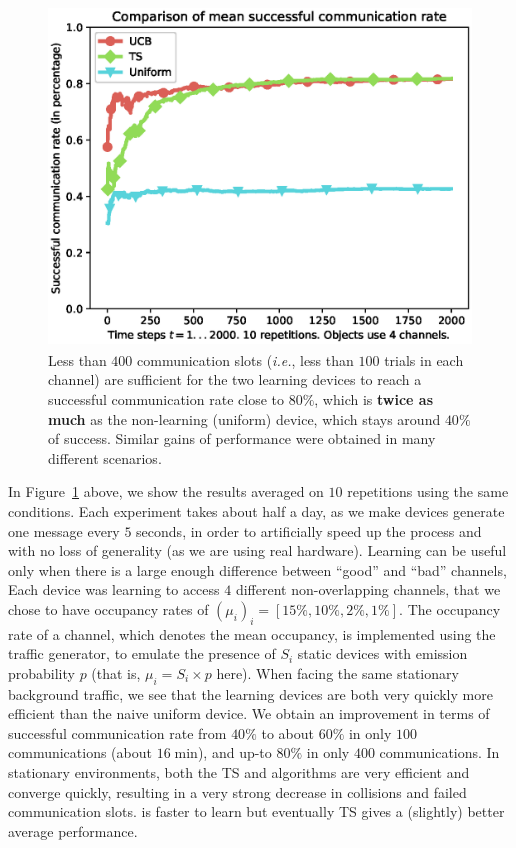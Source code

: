 \begin{figure}[!h]
	\centering
    \includegraphics[height=9.0cm]{plot_datafile_append_Uniform_vs_UCB_vs_TS.eps}
    \caption{Less than $400$ communication slots (\emph{i.e.}, less than $100$ trials in each channel) are sufficient for the two learning devices to reach a successful communication rate close to $80\%$, which is \textbf{twice as much} as the non-learning (uniform) device, which stays around $40\%$ of success. Similar gains of performance were obtained in many different scenarios.}
    \label{fig:42:plot_datafile_append_Uniform_vs_UCB_vs_TS}
\end{figure}

In Figure~\ref{fig:42:plot_datafile_append_Uniform_vs_UCB_vs_TS} above, we show the results averaged on $10$ repetitions using the same conditions.
%
Each experiment takes about half a day,
as we make devices generate one message every $5$ seconds, in order to artificially speed up the process and with no loss of generality (as we are using real hardware).
Learning can be useful only when there is a large enough difference between ``good'' and ``bad'' channels,
Each device was learning to access $4$ different non-overlapping channels, that we chose to have occupancy rates of $(\mu_i)_i = [15\%, 10\%, 2\%, 1\%]$.
The occupancy rate of a channel, which denotes the mean occupancy, is implemented using the traffic generator, to emulate the presence of $S_i$ static devices with emission probability $p$ (that is, $\mu_i = S_i \times p$ here).
When facing the same stationary background traffic, we see that the learning devices are both very quickly more efficient than the naive uniform device.
We obtain an improvement in terms of successful communication rate from $40\%$ to about $60\%$ in only $100$ communications (about $16\;\mathrm{min}$), and up-to $80\%$ in only $400$ communications.
%
In stationary environments, both the TS and \UCB{} algorithms are very efficient and converge quickly, resulting in a very strong decrease in collisions and failed communication slots. \UCB{} is faster to learn but eventually TS gives a (slightly) better average performance.

